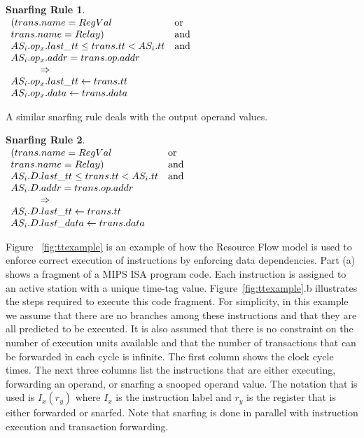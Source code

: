 \documentclass[10pt,twocolumn]{IEEEtran}
\newtheorem{snarf}{Snarfing Rule}
\begin{document}
\begin{snarf}
\label{snar:regop}
\mbox{} \\
\(
\begin{array}{ll}
(trans.name = RegVal\ & \textup{or} \\ trans.name = Relay) & \textup{and} \\
AS_i.op_x.last\_tt \leq trans.tt < AS_i.tt  & \textup{and} \\
AS_i.op_x.addr = trans.op.addr \\
\hspace{3em} \Rightarrow \\
AS_i.op_x.last\_tt \leftarrow trans.tt\\
AS_i.op_x.data \leftarrow trans.data
\end{array}
\)
\end{snarf}

A similar snarfing rule deals with the output operand values.

\begin{snarf}
\label{snar:outregop}
\mbox{} \\
\(
\begin{array}{ll}
(trans.name = RegVal\ & \textup{or} \\ trans.name = Relay) & \textup{and} \\
AS_i.D.last\_tt \leq trans.tt < AS_i.tt & \textup{and}\\
AS_i.D.addr = trans.op.addr \\
\hspace{3em} \Rightarrow \\
AS_i.D.last\_tt \leftarrow trans.tt\\
AS_i.D.last\_data \leftarrow trans.data
\end{array}
\)
\end{snarf}

Figure ~\ref{fig:ttexample} is an example of how the Resource Flow
model is used to enforce correct execution of instructions by
enforcing data dependencies.  Part (a) shows a fragment of a MIPS ISA
program code. 
Each instruction is assigned to an active station with a
unique time-tag value.  
Figure~\ref{fig:ttexample}.b illustrates the
steps required to execute this code fragment. 
For simplicity, in
this example we assume that there are no branches among these
instructions and that they are all predicted to be executed.
It is also assumed
that there is no constraint on the number of execution units available and
that the number of transactions that can be forwarded in each cycle is
infinite.
The f{ir}st column shows the clock cycle times.  The next
three columns list the instructions that are either executing,
forwarding an operand, or snarfing a snooped operand value.  The
notation that is used is $I_x(r_y)$ where $I_x$ is the instruction
label and $r_y$ is the register that is either forwarded or
snarfed.  Note that snarfing is done in parallel with instruction
execution and transaction forwarding.
\end{document}
